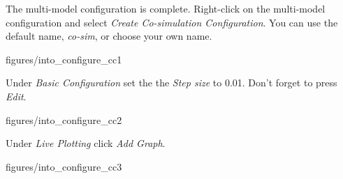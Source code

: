 \documentclass[11pt,a4paper]{../tutorial}
\begin{document}
\begin{instructions}
%

\item The multi-model configuration is complete. Right-click on the multi-model configuration and select \emph{Create Co-simulation Configuration}. You can use the default name, \emph{co-sim}, or choose your own name.

    \begin{annotation}[width=0.85\linewidth,trim=0 0 0 0,clip]{figures/into_configure_cc1}
    \end{annotation}


\newpage
\item Under \emph{Basic Configuration} set the the \emph{Step size} to 0.01. Don't forget to press \emph{Edit}.

    \begin{annotation}[width=0.85\linewidth,trim=0 70 0 0,clip]{figures/into_configure_cc2}
    \end{annotation}


\item Under \emph{Live Plotting} click \emph{Add Graph}.

    \begin{annotation}[width=0.85\linewidth,trim=0 0 0 30,clip]{figures/into_configure_cc3}
    \end{annotation}



\end{instructions}
\end{document}
